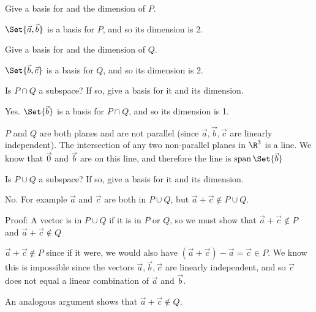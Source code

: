 \documentclass{problemset}
\DeclareMathOperator{\Span}{span}
\begin{document}
	\begin{parts}
		\item Give a basis for and the dimension of $P$.
			\begin{solution}
				$\Set{\vec a,\vec b}$ is a basis for $P$, and so its dimension is 2.
			\end{solution}
		\item Give a basis for and the dimension of $Q$.
			\begin{solution}
				$\Set{\vec b,\vec c}$ is a basis for $Q$, and so its dimension is 2.
			\end{solution}
		\item Is $P\cap Q$ a subspace? If so, give a basis for it and its dimension.
			\begin{solution}
				Yes. $\Set{\vec b}$ is a basis for $P\cap Q$, and so its dimension is 1.

				$P$ and $Q$ are both planes and are not parallel (since
				$\vec a,\vec b,\vec c$ are linearly independent). The intersection
				of any two non-parallel	planes in $\R^3$ is a line.
				We know that $\vec 0$ and $\vec b$ are on this line, and therefore
				the line is $\Span\Set{\vec b}$
			\end{solution}
		\item Is $P\cup Q$ a subspace? If so, give a basis for it and its dimension.
			\begin{solution}
				No. For example $\vec a$ and $\vec c$ are both in $P\cup Q$, but
				$\vec a+\vec c \notin P\cup Q$.

				Proof: A vector is in $P\cup Q$ if it is in $P$ or $Q$, so we must show
				that $\vec a+\vec c\notin P$ and $\vec a+\vec c\notin Q$

				$\vec a+\vec c \notin P$ since if it were, we would also have
				$(\vec a+\vec c)-\vec a=\vec c\in P$. We know this is impossible
				since the vectors $\vec a,\vec b,\vec c$ are linearly independent,
				and so $\vec c$ does not equal a linear combination of $\vec a$
				and $\vec b$.

				An analogous argument shows that $\vec a+\vec c \notin Q$.
			\end{solution}
	\end{parts}
\end{document}
